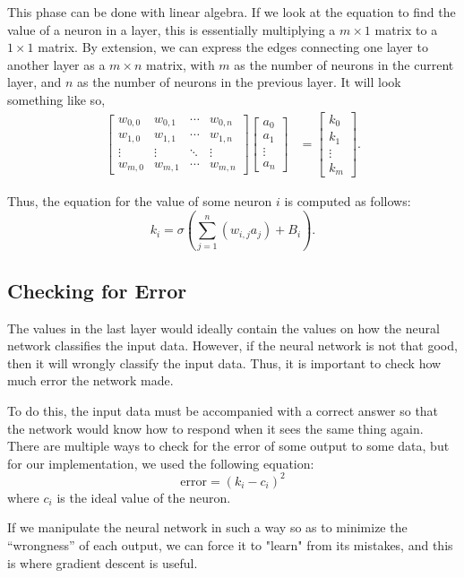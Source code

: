\documentclass[a4paper, 11pt, english]{article}
\begin{document}
\par This phase can be done with linear algebra. If we look at the equation to find the value of a neuron in a layer, this is essentially multiplying a $m \times 1$ matrix to a $1 \times 1$ matrix. By extension, we can express the edges connecting one layer to another layer as a $m \times n$ matrix, with $m$ as the number of neurons in the current layer, and $n$ as the number of neurons in the previous layer. It will look something like so,
\begin{align*}
    \begin{bmatrix}
        w_{0,0} & w_{0,1} & \cdots & w_{0,n} \\
        w_{1,0} & w_{1,1} & \cdots & w_{1,n} \\
        \vdots & \vdots & \ddots & \vdots \\
        w_{m,0} & w_{m,1} & \cdots & w_{m,n}
    \end{bmatrix}
    \begin{bmatrix}
        a_0 \\
        a_1 \\
        \vdots \\
        a_n
    \end{bmatrix} &=
    \begin{bmatrix}
        k_0 \\
        k_1 \\
        \vdots \\
        k_m
    \end{bmatrix}.
\end{align*}
\par Thus, the equation for the value of some neuron $i$ is computed as follows:
\[k_i = \sigma\left(\sum_{j=1}^{n}(w_{i,j}a_{j}) + B_i\right).\]
\subsection{Checking for Error}
\par The values in the last layer would ideally contain the values on how the neural network classifies the input data. However, if the neural network is not that good, then it will wrongly classify the input data. Thus, it is important to check how much error the network made.
\par To do this, the input data must be accompanied with a correct answer so that the network would know how to respond when it sees the same thing again. There are multiple ways to check for the error of some output to some data, but for our implementation, we used the following equation:
\[\mathrm{error} = (k_i - c_i)^2 \]
where $c_i$ is the ideal value of the neuron.
\par If we manipulate the neural network in such a way so as to minimize the “wrongness” of each output, we can force it to "learn" from its mistakes, and this is where gradient descent is useful.
\end{document}
